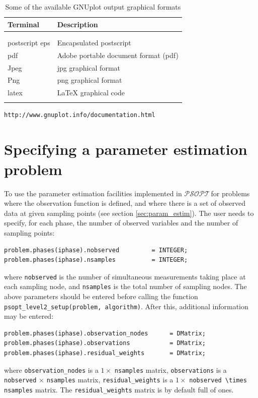 \documentclass[a4paper,11pt]{report}    %
\newcommand{\psopt}{$\mathcal{PSOPT}$\,}  %
\begin{document}
\begin{table}
\begin{center}
\begin{tabular}{ll} 
\textbf{Terminal} & \textbf{Description}     \\ \hline \\ \\
postscript eps                &  Encapsulated postscript       \\
pdf                           &  Adobe portable document format (pdf)     \\ 
Jpeg                          &  jpg graphical format          \\
Png 			      &  png graphical format \\
latex                         &  LaTeX graphical code \\
\\ \hline 
\end{tabular}
\caption{Some of the available GNUplot output graphical formats}\label{tab:gnuplot}
\end{center}
\end{table} 


\begin{verbatim}
http://www.gnuplot.info/documentation.html
\end{verbatim}




\section{Specifying a parameter estimation problem}

To use the parameter estimation facilities implemented in \psopt for problems where the observation function is defined, and 
where there is a set of observed data at given sampling points (see section \ref{sec:param_estim}).  
The user needs to specify, for each phase, the number of observed variables and the number of sampling points:

\begin{verbatim}
problem.phases(iphase).nobserved         = INTEGER;
problem.phases(iphase).nsamples          = INTEGER;
\end{verbatim}
where \verb|nobserved| is the number of simultaneous measurements taking place at each sampling node, 
and \verb|nsamples| is the total number of sampling nodes. The above parameters should be entered before calling    the function 
\verb|psopt_level2_setup(problem, algorithm)|. After this, additional information may be entered:
\begin{verbatim}
problem.phases(iphase).observation_nodes      = DMatrix;
problem.phases(iphase).observations           = DMatrix;
problem.phases(iphase).residual_weights       = DMatrix;
\end{verbatim}
where \verb|observation_nodes| is a $1 \times$ \verb|nsamples| matrix,
\verb|observations| is a \verb|nobserved|  $\times$ \verb|nsamples| matrix,
\verb|residual_weights| is a $1  \times$ \verb|nobserved \times nsamples| matrix.
The \verb|residual_weights| matrix is by default full of ones.
 
\end{document}
